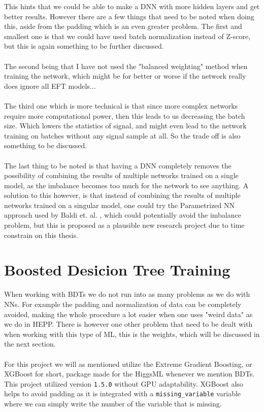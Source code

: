 \documentclass[14pt, a4paper]{book}
\begin{document}
\newpage\noindent This hints that we could be able to make a DNN with more hidden layers and get better results. However there are a few things that need to be noted when doing this, aside from the padding which is an even greater problem.
The first and smallest one is that we could have used batch normalization instead of Z-score, but this is again something to be further discussed.\\
\\The second being that I have not used the "balanced weighting" method when training the network, which might be for better or worse if the network really does ignore all EFT models...\\
\\The third one which is more technical is that since more complex networks require more computational power, then this leads to us decreasing the batch size. Which lowers the statistics of signal, 
and might even lead to the network training on batches without any signal sample at all. So the trade off is also something to be discussed.\\
\\The last thing to be noted is that having a DNN completely removes the possibility of combining the results of multiple networks trained on a single model, as the imbalance becomes too much for the network to see anything.
A solution to this however, is that instead of combining the results of multiple networks trained on a singular model, one could try the Parametrized NN approach used by Baldi et. al. \cite{Baldi_2016}, which could potentially avoid the imbalance problem, but this is 
proposed as a plausible new research project due to time constrain on this thesis.
\clearpage
\graphicspath{{../../figures/}}






\section{Boosted Desicion Tree Training}
When working with BDTs we do not run into as many problems as we do with NNs. For example the padding and normalization of data can be completely avoided, making the whole procedure a lot easier when one uses "weird data" as we do in HEPP.
There is however one other problem that need to be dealt with when working with this type of ML, this is the weights, which will be discussed in the next section.\\
\\For this project we will as mentioned  utilize the Extreme Gradient Boosting, or XGBoost for short, package made for the HiggsML whenever we mention BDTs.
This project utilized version \verb|1.5.0| without GPU adaptability. XGBoost also helps to avoid padding as it is integrated with a \verb|missing_variable| variable where we can simply write the number of the variable that is missing.
\end{document}
